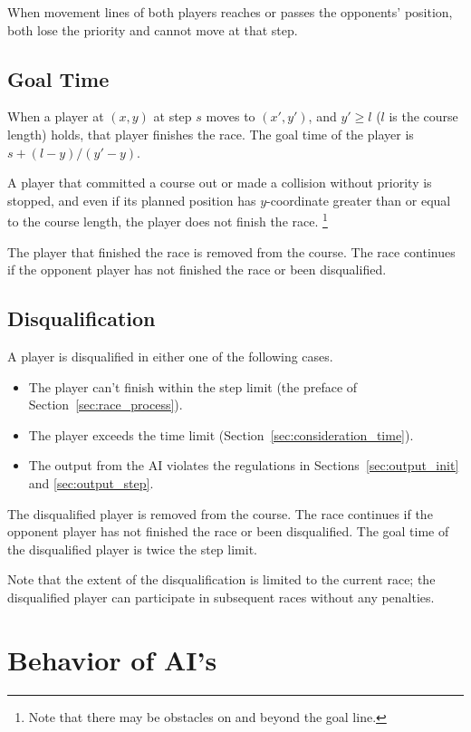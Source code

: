 \documentclass[11pt]{article}
\newcommand\secref[1]{\mbox{Section~\ref{#1}}}
\begin{document}
When movement lines of both players reaches or passes the opponents'
position, both lose the priority and cannot move at that step.

\subsection{Goal Time}
When a player at $(x, y)$ at step $s$ moves to $(x', y')$, and $y'\ge
l$ ($l$ is the course length) holds, that player finishes the race.
The goal time of the player is $s + (l-y)/(y'-y).$

A player that committed a course out or made a collision without
priority is stopped, and even if its planned position has
$y$-coordinate greater than or equal to the course length, the player
does not finish the race.
\footnote{Note that there may be obstacles on and beyond the goal line.}

The player that finished the race is removed from the course.  The
race continues if the opponent player has not finished the race or
been disqualified.

\subsection{Disqualification}\label{sec:disqualification}
A player is disqualified in either one of the following cases.
\begin{itemize}
\item The player can't finish within the step limit (the preface of \secref{sec:race_process}).
\item The player exceeds the time limit (\secref{sec:consideration_time}).
\item The output from the AI violates the regulations in Sections~\ref{sec:output_init} and \ref{sec:output_step}.
\end{itemize}

The disqualified player is removed from the course.  The race
continues if the opponent player has not finished the race or been
disqualified. The goal time of the disqualified player is twice the
step limit.

Note that the extent of the disqualification is limited to the current
race; the disqualified player can participate in subsequent races
without any penalties.

\section{Behavior of AI's}
\end{document}
